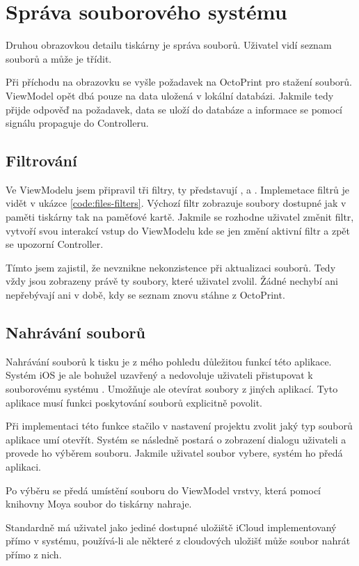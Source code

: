 \section{Správa souborového systému}

Druhou obrazovkou detailu tiskárny je správa souborů.
Uživatel vidí seznam souborů a může je třídit.

Při příchodu na obrazovku se vyšle požadavek na OctoPrint pro stažení souborů.
ViewModel opět dbá pouze na data uložená v lokální databázi.
Jakmile tedy přijde odpověď na požadavek, data se uloží do databáze a informace se pomocí signálu propaguje do Controlleru.

\subsection{Filtrování}

Ve ViewModelu jsem připravil tři filtry, ty představují ,  a .
Implemetace filtrů je vidět v ukázce \ref{code:files-filters}.
Výchozí filtr zobrazuje soubory dostupné jak v paměti tiskárny tak na paměťové kartě.
Jakmile se rozhodne uživatel změnit filtr, vytvoří svou interakcí vstup do ViewModelu kde se jen změní aktivní filtr a zpět se upozorní Controller.


Tímto jsem zajistil, že nevznikne nekonzistence při aktualizaci souborů.
Tedy vždy jsou zobrazeny právě ty soubory, které uživatel zvolil.
Žádné nechybí ani nepřebývají ani v době, kdy se seznam znovu stáhne z OctoPrint.

\subsection{Nahrávání souborů}

Nahrávání souborů k tisku je z mého pohledu důležitou funkcí této aplikace.
Systém iOS je ale bohužel uzavřený a nedovoluje uživateli přistupovat k souborovému systému \cite{imobile-access-fs}.
Umožňuje ale otevírat soubory z jiných aplikací.
Tyto aplikace musí funkci poskytování souborů explicitně povolit.

Při implementaci této funkce stačilo v nastavení projektu zvolit jaký typ souborů aplikace umí otevřít.
Systém se následně postará o zobrazení dialogu uživateli a provede ho výběrem souboru.
Jakmile uživatel soubor vybere, systém ho předá aplikaci.


\bigskip{}

Po výběru se předá umístění souboru do ViewModel vrstvy, která pomocí knihovny Moya soubor do tiskárny nahraje.

Standardně má uživatel jako jediné dostupné uložiště iCloud implementovaný přímo v systému, používá-li ale některé z cloudových uložišť může soubor nahrát přímo z nich.
